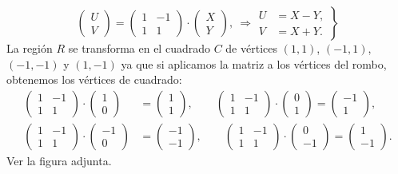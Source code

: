 \documentclass[
  letterpaper,
  DIV=11,
  numbers=noendperiod]{scrreprt}
\begin{document}
\[
\begin{pmatrix}U\\ V\end{pmatrix}=\begin{pmatrix}1 & -1\\ 1& 1\end{pmatrix}\cdot\begin{pmatrix}X\\ Y\end{pmatrix},\ \Rightarrow \left.\begin{array}{rl}U & = X-Y,\\ V & =X+Y.\end{array}\right\}
\] La región \(R\) se transforma en el cuadrado \(C\) de vértices
\((1,1)\), \((-1,1)\), \((-1,-1)\) y \((1,-1)\) ya que si aplicamos la
matriz a los vértices del rombo, obtenemos los vértices de cuadrado: \[
\begin{array}{rl}
\begin{pmatrix}1 & -1\\ 1& 1\end{pmatrix}\cdot \begin{pmatrix}1\\ 0\end{pmatrix} & =\begin{pmatrix}1\\ 1\end{pmatrix},\qquad 
\begin{pmatrix}1 & -1\\ 1& 1\end{pmatrix}\cdot \begin{pmatrix}0\\ 1\end{pmatrix}=\begin{pmatrix}-1\\ 1\end{pmatrix},\\ 
\begin{pmatrix}1 & -1\\ 1& 1\end{pmatrix}\cdot \begin{pmatrix}-1\\ 0\end{pmatrix} & =\begin{pmatrix}-1\\ -1\end{pmatrix},\qquad 
\begin{pmatrix}1 & -1\\ 1& 1\end{pmatrix}\cdot \begin{pmatrix}0\\ -1\end{pmatrix}=\begin{pmatrix}1\\ -1\end{pmatrix}.
\end{array}
\] Ver la figura adjunta.
\end{document}
